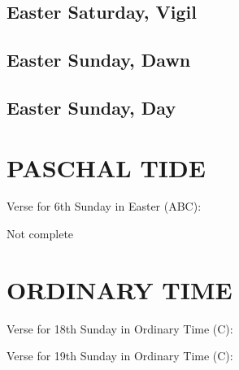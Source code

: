 \documentclass[11pt,oneside]{book} %
\begin{document}
\section{Easter Saturday, Vigil}
\section{Easter Sunday, Dawn}
\section{Easter Sunday, Day}


\chapter{PASCHAL TIDE}



\begin{paragraph}\noindent\begin{large}
Verse for 6th Sunday in Easter (ABC):
\end{large}\newline\end{paragraph}

\begin{paragraph}\noindent
Not complete\newline
\end{paragraph}


\chapter{ORDINARY TIME}


\begin{paragraph}\noindent\begin{large}
Verse for 18th Sunday in Ordinary Time (C):
\end{large}\newline\end{paragraph}


\begin{paragraph}\noindent\begin{large}
Verse for 19th Sunday in Ordinary Time (C):
\end{large}\newline\end{paragraph}
\end{document}
